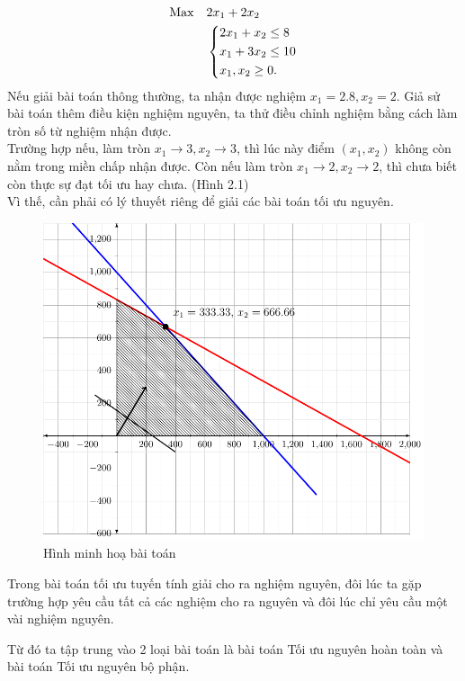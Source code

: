 \documentclass[12pt,a4paper]{report}
\begin{document}
\begin{equation*}
    \begin{split}
      \rm{Max} \quad & 2x_1+2x_2 \\
      &\left\{\begin{split}
          &2x_1+x_2 \le 8\\
          & x_1+3x_2 \le 10\\
          & x_1,x_2 \ge 0.\\
      \end{split}\right.
    \end{split}
\end{equation*}
Nếu giải bài toán thông thường, ta nhận được nghiệm $x_1=2.8,x_2=2$. Giả sử bài toán thêm điều kiện nghiệm nguyên, ta thử điều chỉnh nghiệm bằng cách làm tròn số từ nghiệm nhận được.\\
Trường hợp nếu, làm tròn $x_1 \to 3, x_2 \to 3$, thì lúc này điểm $(x_1,x_2)$ không còn nằm trong miền chấp nhận được. Còn nếu làm tròn $x_1 \to 2, x_2 \to 2$, thì chưa biết còn thực sự đạt tối ưu hay chưa. (Hình 2.1)\\
Vì thế, cần phải có lý thuyết riêng để giải các bài toán tối ưu nguyên.

\begin{figure}
\centering
\includegraphics[width=0.6\linewidth]{plot.pdf}
\caption{Hình minh hoạ bài toán}
\end{figure}






Trong bài toán tối ưu tuyến tính giải cho ra nghiệm nguyên, đôi lúc ta gặp trường hợp yêu cầu tất cả các nghiệm cho ra nguyên và đôi lúc chỉ yêu cầu một vài nghiệm nguyên.

Từ đó ta tập trung vào 2 loại bài toán là bài toán Tối ưu nguyên hoàn toàn và bài toán Tối ưu nguyên bộ phận.
\end{document}
